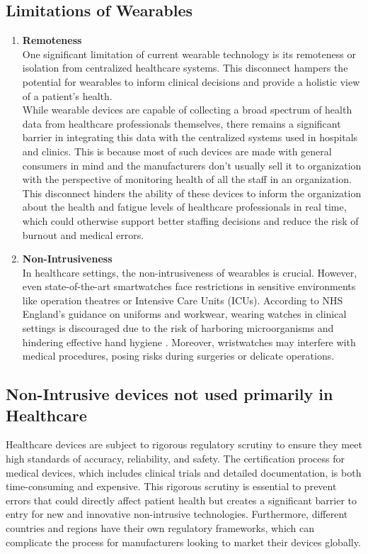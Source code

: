 \subsection{Limitations of Wearables}
\begin{enumerate}
    \item \textbf{Remoteness} \\
    One significant limitation of current wearable technology is its remoteness or isolation from centralized healthcare systems. This disconnect hampers the potential for wearables to inform clinical decisions and provide a holistic view of a patient's health. \\
    While wearable devices are capable of collecting a broad spectrum of health data from healthcare professionals themselves, there remains a significant barrier in integrating this data with the centralized systems used in hospitals and clinics. This is because most of such devices are made with general consumers in mind and the manufacturers don't usually sell it to organization with the perspective of monitoring health of all the staff in an organization. This disconnect hinders the ability of these devices to inform the organization about the health and fatigue levels of healthcare professionals in real time, which could otherwise support better staffing decisions and reduce the risk of burnout and medical errors.

    \item \textbf{Non-Intrusiveness} \\
    In healthcare settings, the non-intrusiveness of wearables is crucial. However, even state-of-the-art smartwatches face restrictions in sensitive environments like operation theatres or Intensive Care Units (ICUs). According to NHS England's guidance on uniforms and workwear, wearing watches in clinical settings is discouraged due to the risk of harboring microorganisms and hindering effective hand hygiene \cite{ref20}. Moreover, wristwatches may interfere with medical procedures, posing risks during surgeries or delicate operations.
    
\end{enumerate}

\subsection{Non-Intrusive devices not used primarily in Healthcare}
Healthcare devices are subject to rigorous regulatory scrutiny to ensure they meet high standards of accuracy, reliability, and safety. The certification process for medical devices, which includes clinical trials and detailed documentation, is both time-consuming and expensive. This rigorous scrutiny is essential to prevent errors that could directly affect patient health but creates a significant barrier to entry for new and innovative non-intrusive technologies. Furthermore, different countries and regions have their own regulatory frameworks, which can complicate the process for manufacturers looking to market their devices globally.\\

